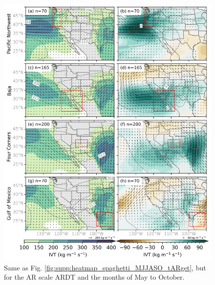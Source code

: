 \documentclass[draft,jgrga]{agutexSI2019}
\begin{document}
\begin{article}
\begin{figure}
\noindent\includegraphics[scale=0.8]{figS8.png}
\caption{Same as Fig. \ref{fig:supp:heatmap_spaghetti_MJJASO_tARget}, but for the AR scale ARDT and the months of May to October.}
\label{fig:supp:heatmap_spaghetti_MJJASO_ARscale}
\end{figure}


\end{article}
\end{document}
